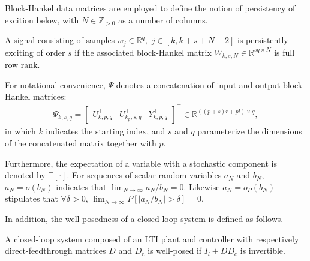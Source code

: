 Block-Hankel data matrices are employed to define the notion of persistency of excition below, with ${N\in\mathbb{Z}_{>0}}$ as a number of columns.
\begin{defn}\label{def:PE}\citep[Def.~10.1]{Verhaegen2007a} A signal consisting of samples ${w_j\!\in\!\mathbb{R}^q},$ $j\!\in\![k,k+s+N-2]$ is persistently exciting of order $s$ if the associated block-Hankel matrix ${ W_{k,s,N}\in\mathbb{R}^{sq \times N}}$ is full row rank.
\end{defn}
%

For notational convenience, $\Psi$ denotes a concatenation of input and output block-Hankel matrices:%
\begin{align}\label{eq:Psi_def}
    \Psi_{k,s,q} = \begin{bmatrix}
        U_{k,p,q}^\top & U_{k_p,s,q}^\top & Y_{k,p,q}^\top
    \end{bmatrix}^\top\in\mathbb{R}^{((p+s)r+pl)\times q},
\end{align}
in which $k$ indicates the starting index, and $s$ and $q$ parameterize the dimensions of the concatenated matrix together with $p$.
%

Furthermore, the expectation of a variable with a stochastic component is denoted by ${\mathbb{E}[\cdot]}$. For sequences of scalar random variables $a_N$ and $b_N$, ${a_N = o(b_N)}$ indicates that ${\lim_{N\rightarrow\infty}a_N/b_N=0}$. Likewise ${a_N=o_P(b_N)}$ stipulates that $\forall \delta > 0$, ${\lim_{N\rightarrow\infty}P[|a_N/b_N|>\delta]=0}$.

In addition, the well-posedness of a closed-loop system is defined as follows.
\begin{defn}\citep{VanOverschee1997a}
    A closed-loop system composed of an \ac{LTI} plant and controller with respectively direct-feedthrough matrices $D$ and $D_\mathrm{c}$ is well-posed if $I_l+DD_\mathrm{c}$ is invertible.
\end{defn}

